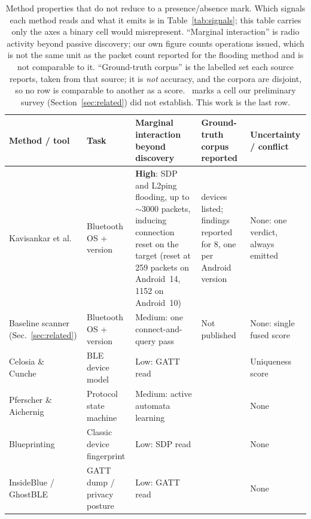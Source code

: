 \documentclass[conference]{IEEEtran}
\newcommand{\unk}{\textendash}
\begin{document}
\begin{table}[!t]
\centering
\footnotesize
\setlength{\tabcolsep}{5pt}
\renewcommand{\arraystretch}{1.3}
\caption{Method properties that do not reduce to a presence/absence mark.
Which signals each method reads and what it emits is in
Table~\ref{tab:signals}; this table carries only the axes a binary cell would
misrepresent. ``Marginal interaction'' is radio activity beyond passive
discovery; our own figure counts operations issued, which is not the same unit
as the packet count reported for the flooding method and is not comparable to
it. ``Ground-truth corpus'' is the labelled set each source reports,
taken from that source; it is \emph{not} accuracy, and the corpora are
disjoint, so no row is comparable to another as a score. \unk\ marks a cell our
preliminary survey (Section~\ref{sec:related}) did not establish. This work is
the last row.}
\label{tab:cap}
\begin{tabular}{@{}>{\raggedright\arraybackslash}p{3.4cm}
>{\raggedright\arraybackslash}p{2.7cm}
>{\raggedright\arraybackslash}p{4.4cm}
>{\raggedright\arraybackslash}p{3.1cm}
>{\raggedright\arraybackslash}p{3.0cm}@{}}
\toprule
\textbf{Method / tool} & \textbf{Task} & \textbf{Marginal interaction beyond discovery} & \textbf{Ground-truth corpus reported} & \textbf{Uncertainty / conflict} \\
\midrule
Kavisankar et al.~\cite{kavisankar2024osid} & Bluetooth OS + version &
\textbf{High}: SDP and L2ping flooding, up to $\sim$3000 packets, inducing
connection reset on the target (reset at 259 packets on Android~14, 1152 on
Android~10) &
23 devices listed; findings reported for 8, one per Android version &
None: one verdict, always emitted \\
\addlinespace
Baseline scanner (Sec.~\ref{sec:related}) & Bluetooth OS + version &
Medium: one connect-and-query pass &
Not published &
None: single fused score \\
\addlinespace
Celosia \& Cunche~\cite{celosia2019gatt} & BLE device model &
Low: GATT read & \unk & Uniqueness score \\
\addlinespace
Pferscher \& Aichernig~\cite{pferscher2022automata} & Protocol state machine &
Medium: active automata learning & \unk & None \\
\addlinespace
Blueprinting~\cite{herfurt2004blueprinting} & Classic device fingerprint &
Low: SDP read & \unk & None \\
\addlinespace
InsideBlue / GhostBLE~\cite{insideblue,ghostble} & GATT dump / privacy posture &
Low: GATT read & \unk & None \\

\end{tabular}
\end{table}
\end{document}
